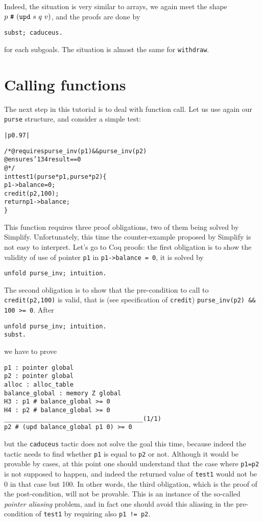 \documentclass[12pt,a4paper,twoside,openright]{report}
\makeatletter
\newcommand{\indextt}[1]{\index{#1@\texttt{#1}}}
\newenvironment{code}{\begin{small}\begin{alltt}%
\begin{tabular}{|p{0.97\textwidth}|}\hline%
}{\\\hline\end{tabular}\end{alltt}\end{small}}
\def\result{\char'134 result}
\makeatother
\begin{document}
Indeed, the situation is very similar to arrays, we again meet the
shape $p~\verb|#|~(\verb|upd|~s~q~v)$, and the proofs are done by
\begin{verbatim}
subst; caduceus.
\end{verbatim}
for each subgoals. The situation is almost the same for
\verb|withdraw|.

\section{Calling functions}
\label{assigns}\indextt{assigns}

The next step in this tutorial is to deal with function call. Let us
use again our \verb|purse| structure, and consider a simple test:
\begin{code}
/*@ requires purse_inv(p1) && purse_inv(p2)
  @ ensures \result == 0
  @*/
int test1(purse *p1, purse *p2) \{
    p1->balance = 0;
    credit(p2,100);
    return p1->balance;
\}
\end{code}

This function requires three proof obligations, two of them being
solved by Simplify. Unfortunately, this time the counter-example
proposed by Simplify is not easy to interpret. Let's go to Coq proofs:
the first obligation is to show the validity of use of pointer
\verb|p1| in \verb|p1->balance = 0|, it is solved by 
\begin{verbatim}
unfold purse_inv; intuition.
\end{verbatim}
The second obligation is to show that the pre-condition to call to
\verb|credit(p2,100)| is valid, that is (see specification of
\verb|credit|) \verb|purse_inv(p2) && 100 >= 0|. After
\begin{verbatim}
unfold purse_inv; intuition.
subst.
\end{verbatim}
we have to prove
\begin{verbatim}
p1 : pointer global
p2 : pointer global
alloc : alloc_table
balance_global : memory Z global
H3 : p1 # balance_global >= 0
H4 : p2 # balance_global >= 0
______________________________________(1/1)
p2 # (upd balance_global p1 0) >= 0
\end{verbatim}
but the \verb|caduceus| tactic does not solve the goal this time,
because indeed the tactic needs to find whether \verb|p1| is equal to
\verb|p2| or not. Although it would be provable by cases, at this
point one should understand that the case where \verb|p1=p2| is not
supposed to happen, and indeed the returned value of \verb|test1| would not be
0 in that case but 100. In other words, the third obligation, which is
the proof of the post-condition, will not be provable. This is an
instance of the so-called \emph{pointer aliasing} problem, and in fact
one should avoid this aliasing in the pre-condition of \verb|test1| by
requiring also \verb|p1 != p2|. 
\end{document}
